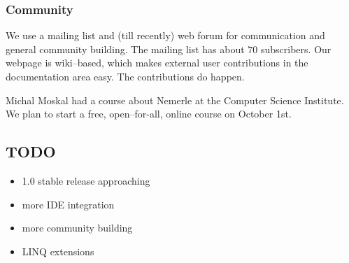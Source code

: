 \documentclass{article}
\begin{document}
\subsubsection{Community}

We use a mailing list and (till recently) web forum for communication
and general community building. The mailing list has about 70 subscribers.
Our webpage is wiki--based, which makes external user contributions
in the documentation area easy. The contributions do happen.

Michal Moskal had a course about Nemerle at the Computer Science
Institute. We plan to start a free, open--for-all, online course
on October 1st.  


\subsection{TODO}

\begin{itemize}
  \item 1.0 stable release approaching
  \item more IDE integration
  \item more community building
  \item LINQ extensions
\end{itemize}
\end{document}
